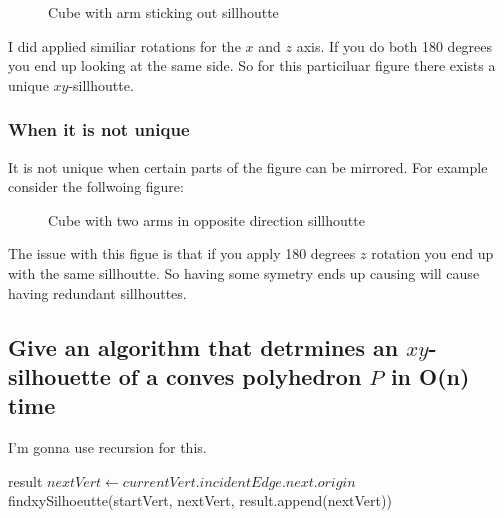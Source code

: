 \documentclass{article}
\begin{document}
\begin{empfile}
\begin{figure}
\caption{Cube with arm sticking out sillhoutte}
\end{figure}

I did applied similiar rotations for the $x$ and $z$ axis. If you
do both 180 degrees you end up looking at the same side. So for this
particiluar figure there exists a unique $xy$-sillhoutte.

\subsubsection{When it is not unique}

It is not unique when certain parts of the figure can be mirrored. For
example consider the follwoing figure:

\begin{figure}
\caption{Cube with two arms in opposite direction sillhoutte}
\end{figure}

The issue with this figue is that if you apply 180 degrees $z$ rotation you
end up with the same sillhoutte. So having some symetry ends up causing will
cause having redundant sillhouttes.

\subsection{Give an algorithm that detrmines an $xy$-silhouette of a conves polyhedron $P$ in O(n) time}
I'm gonna use recursion for this.

\begin{algorithmic}
	 \State \Return result \EndIf
	\State
	$nextVert \gets currentVert.incidentEdge.next.origin$
	\State
	\Return findxySilhoeutte(startVert, nextVert, result.append(nextVert))
	\EndFunction
	\State \Return
	\EndFunction
	\State 
\end{algorithmic}


\end{empfile}
\end{document}
